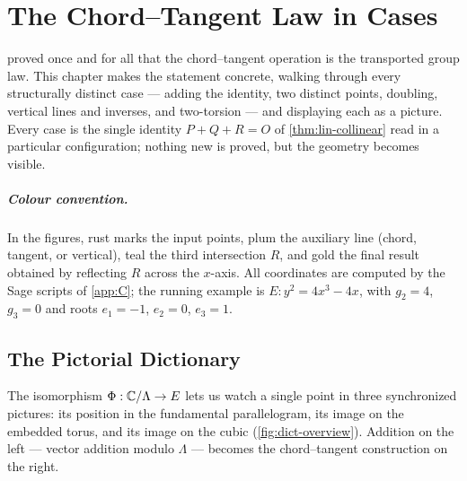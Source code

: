 \chapter{The Chord--Tangent Law in Cases}
\label{ch:chord_tangent_cases}

 proved once and for all that the chord--tangent operation is
the transported group law. This chapter makes the statement concrete, walking
through every structurally distinct case --- adding the identity, two distinct
points, doubling, vertical lines and inverses, and two-torsion --- and displaying
each as a picture. Every case is the single identity \(P + Q + R = O\) of
\cref{thm:lin-collinear} read in a particular configuration; nothing new is
proved, but the geometry becomes visible.

\paragraph{Colour convention.}
In the figures, rust marks the input points, plum the auxiliary line (chord,
tangent, or vertical), teal the third intersection \(R\), and gold the final
result obtained by reflecting \(R\) across the \(x\)-axis. All coordinates are
computed by the Sage scripts of \cref{app:C}; the running example is
\(E : y^2 = 4x^3 - 4x\), with \(g_2 = 4\), \(g_3 = 0\) and roots
\(e_1 = -1\), \(e_2 = 0\), \(e_3 = 1\).

\section{The Pictorial Dictionary}
\label{sec:cases-dictionary}

The isomorphism \(\Phi : \mathbb{C}/\Lambda \to E\) lets us watch a single point in three
synchronized pictures: its position in the fundamental parallelogram, its image
on the embedded torus, and its image on the cubic (\cref{fig:dict-overview}).
Addition on the left --- vector addition modulo \(\Lambda\) --- becomes the
chord--tangent construction on the right.

